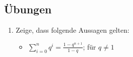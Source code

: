 \subsection{Übungen}
\begin{enumerate}
\item Zeige, dass folgende Aussagen gelten:
\begin{itemize}
\item $\sum\limits_{i=0}^{n} q^i = \frac{1-q^{n+1}}{1-q}$; für $q \neq 1$
\end{itemize}
\end{enumerate}